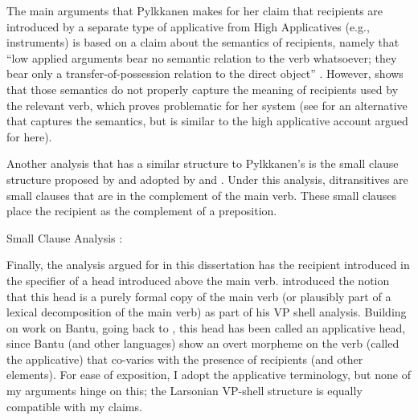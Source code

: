 The main arguments that Pylkkanen makes for her claim that recipients are introduced by a separate type of applicative from High Applicatives (e.g., instruments) is based on a claim about the semantics of recipients, namely that ``low applied arguments bear no semantic relation to the verb whatsoever; they bear only a transfer-of-possession relation to the direct object'' \citep{Pylkkanen.2008}. However, \cite{Larson.2010} shows that those semantics do not properly capture the meaning of recipients used by the relevant verb, which proves problematic for her system (see \citealt{Georgala.2012} for an alternative that captures the semantics, but is similar to the high applicative account argued for here).

Another analysis that has a similar structure to Pylkkanen's is the small clause structure proposed by \cite{DenDikken.1995} and adopted by \cite{Harley.2002,Harley.2015} and \cite{Ormazabal.2012}. Under this analysis, ditransitives are small clauses that are in the complement of the main verb. These small clauses place the recipient as the complement of a preposition.

\begin{exe}
	\ex Small Clause Analysis \citep[ simplified from ex. 38]{DenDikken.1995}:\\
\end{exe}

Finally, the analysis argued for in this dissertation has the recipient introduced in the specifier of a head introduced above the main verb. \cite{Larson.1988} introduced the notion that this head is a purely formal copy of the main verb (or plausibly part of a lexical decomposition of the main verb) as part of his VP shell analysis. Building on work on Bantu, going back to \cite{Baker.1988b}, this head has been called an applicative head, since Bantu (and other languages) show an overt morpheme on the verb (called the applicative) that co-varies with the presence of recipients (and other elements). For ease of exposition, I adopt the applicative terminology, but none of my arguments hinge on this; the Larsonian VP-shell structure is equally compatible with my claims.

